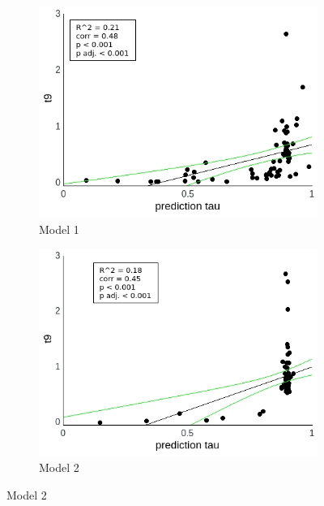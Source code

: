 \documentclass[a4paper]{scrreprt}
\begin{document}
\begin{figure}
\centering
\begin{subfigure}[b]{0.49\textwidth}
        \includegraphics[width=\textwidth]{figs/sec3/pred/pred_t9_mod1.jpeg}
        \caption{Model 1}
    \end{subfigure}
    \begin{subfigure}[b]{0.49\textwidth}
        \includegraphics[width=\textwidth]{figs/sec3/pred/pred_t9_mod2.jpeg}
        \caption{Model 2}
    \end{subfigure}


\end{figure}
\end{document}

